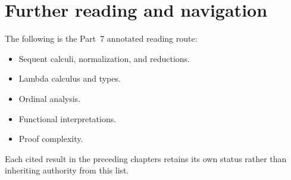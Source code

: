 \section{Further reading and navigation}
\label{sec:p07-further-reading}

The following is the Part~7 annotated reading route:
\begin{itemize}
  \item Sequent calculi, normalization, and reductions.
        \par\parencite{Gentzen1934a,Gentzen1935b}
        \par\parencite{TroelstraSchwichtenberg2000}
  \item Lambda calculus and types.
        \par\parencite{Barendregt1984,GirardLafontTaylor1989}
  \item Ordinal analysis. \par\parencite{Takeuti1987,Pohlers2009}
  \item Functional interpretations.
        \par\parencite{AvigadFeferman1998,Kohlenbach2008}
  \item Proof complexity. \par\parencite{CookReckhow1979,Krajicek2019}
\end{itemize}
Each cited result in the preceding chapters retains its own status rather than
inheriting authority from this list.

